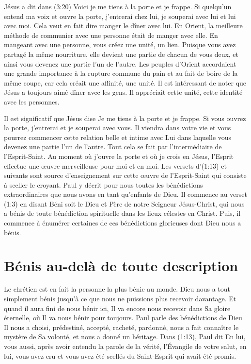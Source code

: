Jésus a dit dans (3:20)\frcolon{}
 \Og Voici\frcolon{} je me tiens à la porte et je frappe.
 Si quelqu'un entend ma voix et ouvre la porte,
 j'entrerai chez lui, je souperai avec lui et lui avec moi. \Fg{}
 Cela veut en fait dire\frcolon{} \Og manger le dîner avec lui. \Fg{}
 En Orient, la meilleure méthode de communier avec une personne
 était de manger avec elle. En mangeant avec une personne,
 vous créez une unité, un lien.
 Puisque vous avez partagé la même nourriture, elle devient une partie
 de chacun de vous deux, et ainsi vous devenez une partie l'un de l'autre.
 Les peuples d'Orient accordaient une grande importance à la rupture commune
 du pain et au fait de boire de la même coupe,
 car cela créait une affinité, une unité.
 Il est intéressant de noter que Jésus a toujours aimé dîner avec les gens.
 Il appréciait cette unité, cette identité avec les personnes.


Il est significatif que Jésus dise\frcolon{}
 \Og Je me tiens à la porte et je frappe.
 Si vous ouvrez la porte, j'entrerai et je souperai avec vous. \Fg{}
 Il viendra dans votre vie et vous pourrez commencer cette relation belle
 et intime avec Lui dans laquelle vous devenez une partie l'un de l'autre.
 Tout cela se fait par l'intermédiaire de l'Esprit-Saint.
 Au moment où j'ouvre la porte et où je crois en Jésus,
 l'Esprit effectue une œuvre merveilleuse pour moi et en moi.
 Les versets d'(1:13) et suivants sont source
 d'enseignement sur cette œuvre de l'Esprit-Saint
 qui consiste à sceller le croyant.
 Paul y décrit pour nous toutes les bénédictions extraordinaires
 que nous avons en tant qu'enfants de Dieu.
 Il commence au verset (1:3) en disant\frcolon{}
 \Og Béni soit le Dieu et Père de notre Seigneur Jésus-Christ,
 qui nous a bénis de toute bénédiction spirituelle
 dans les lieux célestes en Christ. \Fg{}
 Puis, il commence à énumérer certaines de ces bénédictions glorieuses
 dont Dieu nous a bénis.


\section{B\'enis au-del\`a de toute description}

Le chrétien est en fait la personne la plus bénie au monde.
 Dieu nous a tout simplement bénis jusqu'à ce que nous ne puissions plus
 recevoir davantage.
 Et quand il aura fini de nous bénir ici, Il va encore nous recevoir
 dans Sa gloire éternelle, où Il va nous bénir pour toujours.
 Paul parle des bénédictions de Dieu\frcolon{} Il nous a choisi, prédestiné,
 accepté, racheté, pardonné, nous a fait connaître
 le mystère de Sa volonté, et nous a donné un héritage.
 Dans (1:13), Paul dit\frcolon{}
 \Og En lui, vous aussi, après avoir entendu la parole de la vérité,
 l'Évangile de votre salut, en lui, vous avez cru et vous avez été scellés
 du Saint-Esprit qui avait été promis. \Fg{}

